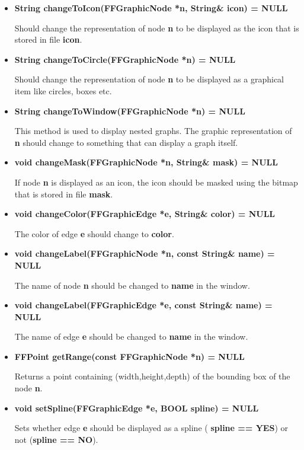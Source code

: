 \begin{itemize}
  Should change the color of node {\bf n} to {\bf color}.
  
\item{\bf String changeToIcon(FFGraphicNode *n, String\& icon) =
    NULL}
  
  Should change the representation of node {\bf n} to be
  displayed as the icon that is stored in file {\bf icon}.

\item{\bf String changeToCircle(FFGraphicNode *n) = NULL}
  
  Should change the representation of node {\bf n} to be
  displayed as a graphical item like circles, boxes etc.

\item{\bf String changeToWindow(FFGraphicNode *n) = NULL}
  
  This method is used to display nested graphs. The graphic
  representation of {\bf n} should change to something that can
  display a graph itself.

\item{\bf void changeMask(FFGraphicNode *n, String\& mask) = NULL}
  
  If node {\bf n} is displayed as an icon, the icon should be
  masked using the bitmap that is stored in file {\bf mask}.
  
\item{\bf void changeColor(FFGraphicEdge *e, String\& color) =
    NULL}
  
  The color of edge {\bf e} should change to {\bf color}.
  
\item{\bf void changeLabel(FFGraphicNode *n, const String\& name)
    = NULL}
  
  The name of node {\bf n} should be changed to {\bf name} in the
  window.
  
\item{\bf void changeLabel(FFGraphicEdge *e, const String\& name)
    = NULL}
  
  The name of edge {\bf e} should be changed to {\bf name} in the
  window.

\item{\bf FFPoint getRange(const FFGraphicNode *n) = NULL}
  
  Returns a point containing (width,height,depth) of the bounding
  box of the node {\bf n}.

\item{\bf void setSpline(FFGraphicEdge *e, BOOL spline) = NULL}
  
  Sets whether edge {\bf e} should be displayed as a spline ({\bf
    spline == YES}) or not ({\bf spline == NO}).


\end{itemize}
